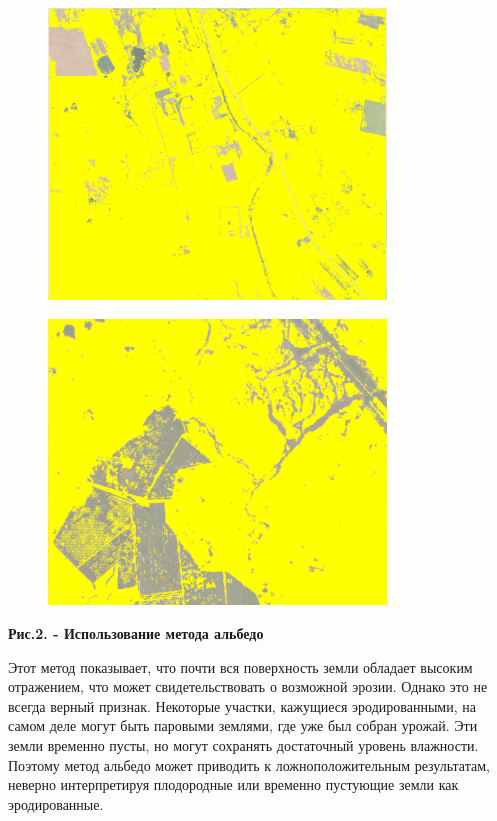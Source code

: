 \begin{figure}[H]
	\centering
	\includegraphics[width=0.8\textwidth]{media/ict/image33}
	\caption*{}
\end{figure}


\begin{figure}[H]
	\centering
	\includegraphics[width=0.8\textwidth]{media/ict/image34}
	\caption*{}
\end{figure}


{\bfseries Рис.2. - Использование метода альбедо}

Этот метод показывает, что почти вся поверхность земли обладает высоким
отражением, что может свидетельствовать о возможной эрозии. Однако это
не всегда верный признак. Некоторые участки, кажущиеся эродированными,
на самом деле могут быть паровыми землями, где уже был собран урожай.
Эти земли временно пусты, но могут сохранять достаточный уровень
влажности. Поэтому метод альбедо может приводить к ложноположительным
результатам, неверно интерпретируя плодородные или временно пустующие
земли как эродированные.

